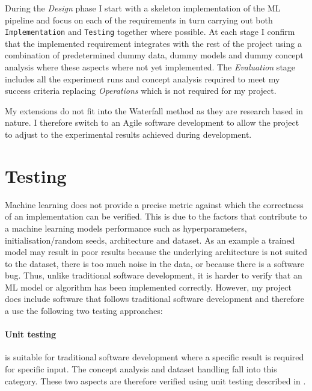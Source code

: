 During the \textit{Design} phase I start with a skeleton implementation of the ML pipeline and focus on each of the requirements in turn carrying out both \texttt{Implementation} and \texttt{Testing} together where possible.
At each stage I confirm that the implemented requirement integrates with the rest of the project using a combination of predetermined dummy data, dummy models and dummy concept analysis where these aspects where not yet implemented.
The \textit{Evaluation} stage includes all the experiment runs and concept analysis required to meet my success criteria replacing \textit{Operations} which is not required for my project.

My extensions do not fit into the Waterfall method as they are research based in nature. I therefore switch to an Agile software development \cite{beck2001manifesto} to allow the project to adjust to the experimental results achieved during development.

\section{Testing}
\label{sec:testing}


Machine learning does not provide a precise metric against which the correctness of an implementation can be verified.
This is due to the factors that contribute to a machine learning models performance such as hyperparameters, initialisation/random seeds, architecture and dataset.
As an example a trained model may result in poor results because the underlying architecture is not suited to the dataset, there is too much noise in the data, or because there is a software bug.
Thus, unlike traditional software development, it is harder to verify that an ML model or algorithm has been implemented correctly.
However, my project does include software that follows traditional software development and therefore a use the following two testing approaches:

\paragraph{Unit testing}
is suitable for traditional software development where a specific result is required for specific input.
The concept analysis and dataset handling fall into this category.
These two aspects are therefore verified using unit testing described in .

